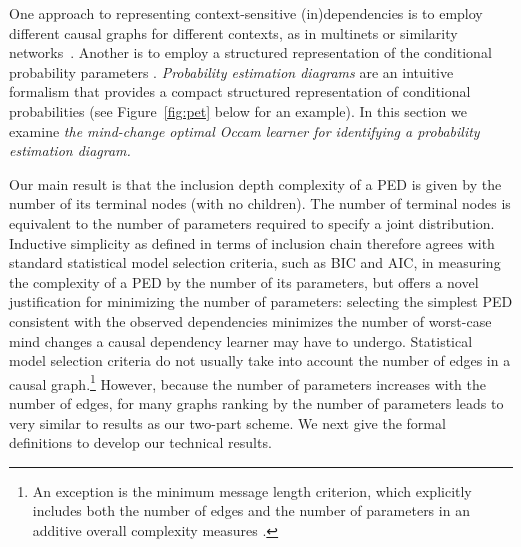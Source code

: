 \documentclass{elsarticle}%
\begin{document}
One approach to representing context-sensitive (in)dependencies is to employ different causal graphs for different contexts, as in multinets or similarity networks~\cite{Geiger1996}. Another is to employ a structured representation of the conditional probability parameters \cite{lauritzen88:_local,Boutilier1996,friedman98:_learn_bayes,Provost2003}. 
{\em Probability estimation diagrams} \cite{Boutilier1999} are an intuitive formalism that provides a compact structured representation of conditional probabilities (see Figure~\ref{fig:pet} below for an example).  In this section we examine {\em the mind-change optimal Occam learner for identifying a probability estimation diagram.}

Our main result is that the inclusion depth complexity of a PED is given by the number of its terminal nodes (with no children). The number of terminal nodes is equivalent to the number of parameters required to specify a joint distribution. Inductive simplicity as defined in terms of inclusion chain therefore agrees with standard statistical model selection criteria, such as BIC and AIC, in measuring the complexity of a PED by the number of its parameters, but offers a novel justification for minimizing the number of parameters: selecting the simplest PED consistent with the observed dependencies minimizes the number of worst-case mind changes a causal dependency learner may have to undergo. Statistical model selection criteria do not usually take into account the number of edges in a causal graph.\footnote{An exception is the minimum message length criterion, which explicitly includes both the number of edges and the number of parameters in an additive overall complexity measures \cite{Dowe2011}.}
  However, because the number of parameters increases with the number of edges, for many graphs ranking by the number of parameters leads to very similar to results as our two-part scheme. We next give the formal definitions to develop our technical results. 


\end{document}
